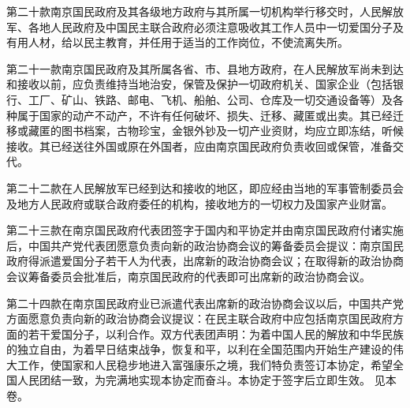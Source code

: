 \begin{maonote}
第二十款南京国民政府及其各级地方政府与其所属一切机构举行移交时，人民解放军、各地人民政府及中国民主联合政府必须注意吸收其工作人员中一切爱国分子及有用人材，给以民主教育，并任用于适当的工作岗位，不使流离失所。

第二十一款南京国民政府及其所属各省、市、县地方政府，在人民解放军尚未到达和接收以前，应负责维持当地治安，保管及保护一切政府机关、国家企业（包括银行、工厂、矿山、铁路、邮电、飞机、船舶、公司、仓库及一切交通设备等）及各种属于国家的动产不动产，不许有任何破坏、损失、迁移、藏匿或出卖。其已经迁移或藏匿的图书档案，古物珍宝，金银外钞及一切产业资财，均应立即冻结，听候接收。其已经送往外国或原在外国者，应由南京国民政府负责收回或保管，准备交代。

第二十二款在人民解放军已经到达和接收的地区，即应经由当地的军事管制委员会及地方人民政府或联合政府委任的机构，接收地方的一切权力及国家产业财富。

第二十三款在南京国民政府代表团签字于国内和平协定并由南京国民政府付诸实施后，中国共产党代表团愿意负责向新的政治协商会议的筹备委员会提议：南京国民政府得派遣爱国分子若干人为代表，出席新的政治协商会议；在取得新的政治协商会议筹备委员会批准后，南京国民政府的代表即可出席新的政治协商会议。

第二十四款在南京国民政府业已派遣代表出席新的政治协商会议以后，中国共产党方面愿意负责向新的政治协商会议提议：在民主联合政府中应包括南京国民政府方面的若干爱国分子，以利合作。双方代表团声明：为着中国人民的解放和中华民族的独立自由，为着早日结束战争，恢复和平，以利在全国范围内开始生产建设的伟大工作，使国家和人民稳步地进入富强康乐之境，我们特负责签订本协定，希望全国人民团结一致，为完满地实现本协定而奋斗。本协定于签字后立即生效。
见本卷。
\end{maonote}
